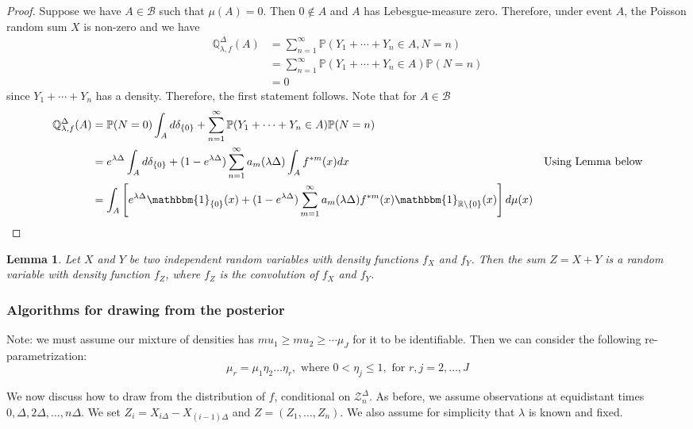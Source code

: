 \documentclass[a4paper,11pt]{article}
\theoremstyle{theorem}
\newtheorem{lem}{Lemma}[section]
\theoremstyle{definition}
\theoremstyle{remark}
\begin{document}
\begin{proof}
Suppose we have $A \in \mathcal{B}$ such that $\mu(A) = 0$. Then $0 \notin A$ and $A$ has Lebesgue-measure zero. Therefore, under event $A$, the Poisson random sum $X$ is non-zero and we have 
\begin{align*}
\mathbb{Q}_{\lambda, f}^{\Delta}(A) &= \sum_{n=1}^{\infty}{\mathbb{P}(Y_1 + \dotsb + Y_n  \in A, N = n)} \\
&= \sum_{n=1}^{\infty}{\mathbb{P}(Y_1 + \dotsb + Y_n  \in A)\mathbb{P}(N = n)} \\
&= 0
\end{align*}
since $Y_1 + \dotsb + Y_n$ has a density. Therefore, the first statement follows. Note that for $A \in \mathcal{B}$
\begin{align*}
\mathbb{Q}_{\lambda, f}^{\Delta}(A) &= \mathbb{P}(N = 0)\int_{A}{d\delta_{\{0\}}} + \sum_{n=1}^{\infty}{\mathbb{P}(Y_1 + \dotsb + Y_n  \in A)\mathbb{P}(N = n)} \\
&= e^{\lambda \Delta}\int_{A}{d\delta_{\{0\}}} + (1 - e^{\lambda \Delta})\sum_{n=1}^{\infty}{a_m(\lambda \Delta)\int_{A}{f^{\ast m}(x)dx}} & \text{Using Lemma below} \\
&= \int_{A}\left[{e^{\lambda \Delta} \mathbbm{1}_{\{0\}}(x) + (1 - e^{\lambda \Delta})\sum_{m=1}^{\infty}{a_m(\lambda \Delta) f^{\ast m}(x)\mathbbm{1}_{\mathbb{R}\setminus \{0\}}(x)}}\right]d\mu(x)
\end{align*}
\end{proof}

\begin{lem} \label{conv}
Let $X$ and $Y$ be two independent random variables with density
functions $f_{X}$ and $f_{Y}$. Then the sum $Z = X + Y$ is a random variable with density function $f_{Z}$, where $f_Z$ is the convolution of $f_X$ and $f_Y$. 
\end{lem}

\subsubsection{Algorithms for drawing from the posterior}

Note: we must assume our mixture of densities has $mu_1 \geq mu_2 \geq \dotsb \mu_J$ for it to be identifiable. Then we can consider the following re-parametrization:
\[
\mu_r = \mu_1 \eta_2 \dotsc \eta_r, \text{ where } 0 < \eta_j \leq 1, \text{ for } r, j = 2, \dotsc, J
\]

We now discuss how to draw  from the distribution of $f$, conditional on $\mathcal{Z}_{n}^{\Delta}$. As before, we assume observations at equidistant times $0, \Delta, 2\Delta, \dotsc, n\Delta$.  We set $Z_i = X_{i\Delta} - X_{(i-1)\Delta}$ and $Z = (Z_1, \dotsc, Z_n)$. We also assume for simplicity that $\lambda$ is known and fixed.
\end{document}
